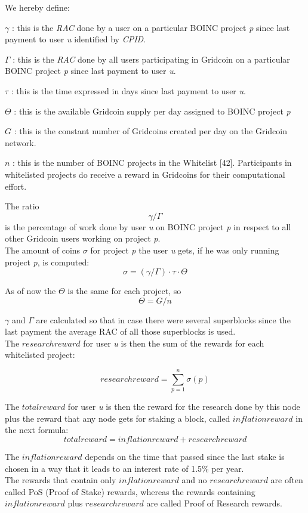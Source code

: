 We hereby define:
\begin{description}
  \item{$\gamma$} : this is the \textit{RAC} done by a user on a particular BOINC project \textit{p} since last payment to user \textit{u} identified by \textit{CPID}.
  \item{$\Gamma$} : this is the \textit{RAC} done by all users participating in Gridcoin on a particular BOINC project \textit{p} since last payment to user \textit{u}.
  \item{$\tau$} : this is the time expressed in days since last payment to user \textit{u}.
  \item{$\Theta$} : this is the available Gridcoin supply per day assigned to BOINC project \textit{p}
  \item{$G$} : this is the constant number of Gridcoins created per day on the Gridcoin network. 
  \item{$n$} : this is the number of BOINC projects in the Whitelist [42]. Participants in whitelisted projects do receive a reward in Gridcoins for their computational effort.  
\end{description}

The ratio
\[\gamma/\Gamma\]
is the percentage of work done by user \textit{u} on BOINC project \textit{p} in respect to all other Gridcoin users working on project \textit{p}.\\

The amount of coins $\sigma$ for project \textit{p} the user \textit{u} gets, if he was only running project \textit{p}, is computed:
\[ \sigma = (\gamma / \Gamma) \cdot \tau \cdot \Theta \]

As of now the $\Theta$ is the same for each project, so
\[ \Theta = G/n \]

$\gamma$ and $\Gamma$ are calculated so that in case there were several superblocks since the last payment the average RAC of all those superblocks is used.\\

The $researchreward$ for user \textit{u} is then the sum of the rewards for each whitelisted project:

\[ researchreward = \sum_{p=1}^{n} \sigma(p) \]


The $totalreward$  for user \textit{u} is then the reward for the research done by this node plus the reward that any node gets for staking a block, called $inflationreward$ in the next formula:
\[ totalreward = inflationreward +  researchreward \]

The $inflationreward$ depends on the time that passed since the last stake is chosen in a way that it leads to an interest rate of 1.5\% per year.\\

The rewards that contain only $inflationreward$ and no $researchreward$
are often called PoS (Proof of Stake) rewards, whereas the rewards containing $inflationreward$ plus $researchreward$ are called Proof of Research rewards.
